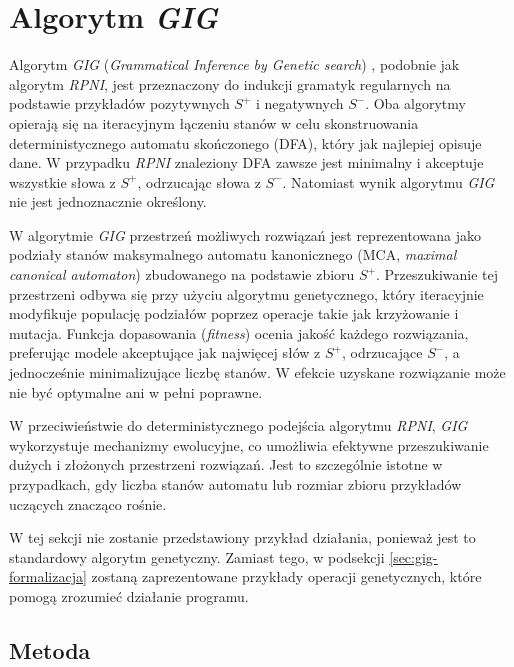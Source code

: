 \section{Algorytm \textit{GIG}}
\label{sec:gig}

Algorytm \textit{GIG} (\textit{Grammatical Inference by Genetic search}) \cite{GIG}, podobnie jak algorytm \textit{RPNI}, jest przeznaczony do indukcji gramatyk regularnych na podstawie przykładów pozytywnych \( S^+ \) i negatywnych \( S^- \). Oba algorytmy opierają się na iteracyjnym łączeniu stanów w celu skonstruowania deterministycznego automatu skończonego (DFA), który jak najlepiej opisuje dane. W przypadku \textit{RPNI} znaleziony DFA zawsze jest minimalny i akceptuje wszystkie słowa z \( S^+ \), odrzucając słowa z \( S^- \). Natomiast wynik algorytmu \textit{GIG} nie jest jednoznacznie określony.

W algorytmie \textit{GIG} przestrzeń możliwych rozwiązań jest reprezentowana jako podziały stanów maksymalnego automatu kanonicznego (MCA, \textit{maximal canonical automaton}) zbudowanego na podstawie zbioru \( S^+ \). Przeszukiwanie tej przestrzeni odbywa się przy użyciu algorytmu genetycznego, który iteracyjnie modyfikuje populację podziałów poprzez operacje takie jak krzyżowanie i mutacja. Funkcja dopasowania (\textit{fitness}) ocenia jakość każdego rozwiązania, preferując modele akceptujące jak najwięcej słów z \( S^+ \), odrzucające \( S^- \), a jednocześnie minimalizujące liczbę stanów. W efekcie uzyskane rozwiązanie może nie być optymalne ani w pełni poprawne.

W przeciwieństwie do deterministycznego podejścia algorytmu \textit{RPNI}, \textit{GIG} wykorzystuje mechanizmy ewolucyjne, co umożliwia efektywne przeszukiwanie dużych i złożonych przestrzeni rozwiązań. Jest to szczególnie istotne w przypadkach, gdy liczba stanów automatu lub rozmiar zbioru przykładów uczących znacząco rośnie.

W tej sekcji nie zostanie przedstawiony przykład działania, ponieważ jest to standardowy algorytm genetyczny. Zamiast tego, w podsekcji \ref{sec:gig-formalizacja} zostaną zaprezentowane przykłady operacji genetycznych, które pomogą zrozumieć działanie programu.

\subsection{Metoda}


